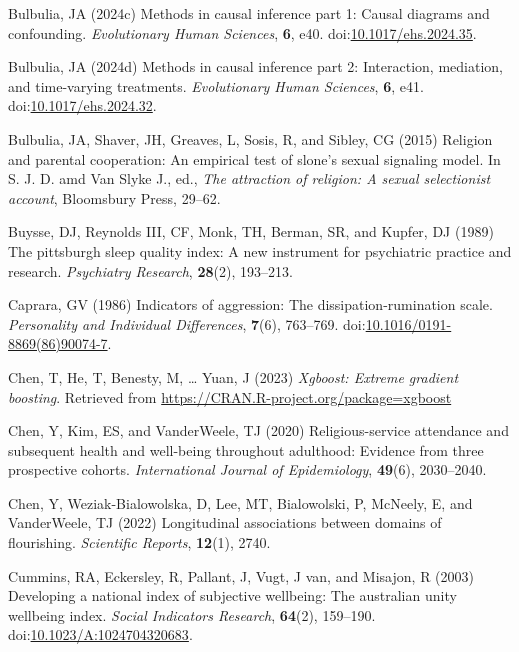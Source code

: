 \documentclass[
  single column]{article}
\newlength{\cslhangindent}
\newenvironment{CSLReferences}[2] %
 {\begin{list}{}{%
  \setlength{\itemindent}{0pt}
  \setlength{\leftmargin}{0pt}
  \setlength{\parsep}{0pt}
  \ifodd #1
   \setlength{\leftmargin}{\cslhangindent}
   \setlength{\itemindent}{-1\cslhangindent}
  \fi
  \setlength{\itemsep}{#2\baselineskip}}}
 {\end{list}}
\begin{document}
\begin{CSLReferences}{1}{0}
Bulbulia, JA (2024c) Methods in causal inference part 1: Causal diagrams
and confounding. \emph{Evolutionary Human Sciences}, \textbf{6}, e40.
doi:\href{https://doi.org/10.1017/ehs.2024.35}{10.1017/ehs.2024.35}.

Bulbulia, JA (2024d) Methods in causal inference part 2: Interaction,
mediation, and time-varying treatments. \emph{Evolutionary Human
Sciences}, \textbf{6}, e41.
doi:\href{https://doi.org/10.1017/ehs.2024.32}{10.1017/ehs.2024.32}.

Bulbulia, JA, Shaver, JH, Greaves, L, Sosis, R, and Sibley, CG (2015)
Religion and parental cooperation: An empirical test of slone's sexual
signaling model. In S. J. D. amd Van Slyke J., ed., \emph{The attraction
of religion: A sexual selectionist account}, Bloomsbury Press, 29--62.

Buysse, DJ, Reynolds III, CF, Monk, TH, Berman, SR, and Kupfer, DJ
(1989) The pittsburgh sleep quality index: A new instrument for
psychiatric practice and research. \emph{Psychiatry Research},
\textbf{28}(2), 193--213.

Caprara, GV (1986) Indicators of aggression: The dissipation-rumination
scale. \emph{Personality and Individual Differences}, \textbf{7}(6),
763--769.
doi:\href{https://doi.org/10.1016/0191-8869(86)90074-7}{10.1016/0191-8869(86)90074-7}.

Chen, T, He, T, Benesty, M, \ldots{} Yuan, J (2023) \emph{Xgboost:
Extreme gradient boosting}. Retrieved from
\url{https://CRAN.R-project.org/package=xgboost}

Chen, Y, Kim, ES, and VanderWeele, TJ (2020) Religious-service
attendance and subsequent health and well-being throughout adulthood:
Evidence from three prospective cohorts. \emph{International Journal of
Epidemiology}, \textbf{49}(6), 2030--2040.

Chen, Y, Weziak-Bialowolska, D, Lee, MT, Bialowolski, P, McNeely, E, and
VanderWeele, TJ (2022) Longitudinal associations between domains of
flourishing. \emph{Scientific Reports}, \textbf{12}(1), 2740.

Cummins, RA, Eckersley, R, Pallant, J, Vugt, J van, and Misajon, R
(2003) Developing a national index of subjective wellbeing: The
australian unity wellbeing index. \emph{Social Indicators Research},
\textbf{64}(2), 159--190.
doi:\href{https://doi.org/10.1023/A:1024704320683}{10.1023/A:1024704320683}.


\end{CSLReferences}
\end{document}
